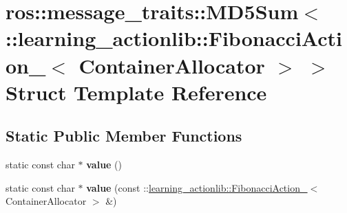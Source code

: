 \hypertarget{structros_1_1message__traits_1_1MD5Sum_3_01_1_1learning__actionlib_1_1FibonacciAction___3_01ContainerAllocator_01_4_01_4}{}\section{ros\+:\+:message\+\_\+traits\+:\+:M\+D5\+Sum$<$ \+:\+:learning\+\_\+actionlib\+:\+:Fibonacci\+Action\+\_\+$<$ Container\+Allocator $>$ $>$ Struct Template Reference}
\label{structros_1_1message__traits_1_1MD5Sum_3_01_1_1learning__actionlib_1_1FibonacciAction___3_01ContainerAllocator_01_4_01_4}
\subsection*{Static Public Member Functions}
\begin{DoxyCompactItemize}
\item 
\mbox{\label{structros_1_1message__traits_1_1MD5Sum_3_01_1_1learning__actionlib_1_1FibonacciAction___3_01ContainerAllocator_01_4_01_4_a71bda0e369a8b653b0f41ccacc4f4d42}} 
static const char $\ast$ {\bfseries value} ()
\item 
\mbox{\label{structros_1_1message__traits_1_1MD5Sum_3_01_1_1learning__actionlib_1_1FibonacciAction___3_01ContainerAllocator_01_4_01_4_a4b5e41c52be0767a9ed2a464f7a05754}} 
static const char $\ast$ {\bfseries value} (const \+::\hyperlink{structlearning__actionlib_1_1FibonacciAction__}{learning\+\_\+actionlib\+::\+Fibonacci\+Action\+\_\+}$<$ Container\+Allocator $>$ \&)
\end{DoxyCompactItemize}
